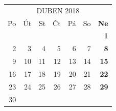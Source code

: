 \documentclass{article}
\begin{document}
\newpage
\begin{table}[t!]
\centering
{}
\end{table}

\selectfont
\def\arraystretch{1.75}
\tabcolsep=10pt
\begin{tabular}{*6{r}>{\bfseries}r}
\multicolumn{7}{c}{DUBEN 2018}\\
\rowcolor[gray]{.75} Po & Út & St & Čt & Pá & So & Ne \\
\hline
                        &    &    &    &    &    & 1  \\
                     2  & 3  & 4  & 5  & 6  & 7  & 8  \\
                     9  & 10 & 11 & 12 & 13 & 14 & 15 \\
                     16 & 17 & 18 & 19 & 20 & 21 & 22 \\
                     23 & 24 & 25 & 26 & 27 & 28 & 29 \\
		     30 &    &    &    &    &    &    \\
\end{tabular}

\newpage
\begin{table}[t!]
\centering
{}
\end{table}
\end{document}
